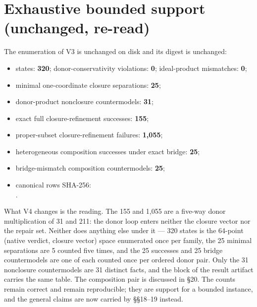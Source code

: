 \section{Exhaustive bounded support (unchanged, re-read)}

The enumeration of V3 is unchanged on disk and its digest is unchanged:

\begin{itemize}
  \item states: \textbf{320}; donor-conservativity violations: \textbf{0}; ideal-product
    mismatches: \textbf{0};
  \item minimal one-coordinate closure separations: \textbf{25};
  \item donor-product nonclosure countermodels: \textbf{31};
  \item exact full closure-refinement successes: \textbf{155};
  \item proper-subset closure-refinement failures: \textbf{1,055};
  \item heterogeneous composition successes under exact bridge: \textbf{25};
  \item bridge-mismatch composition countermodels: \textbf{25};
  \item canonical rows SHA-256:\\
    .
\end{itemize}

What V4 changes is the reading. The 155 and 1,055 are a five-way donor
multiplication of 31 and 211: the donor loop enters neither the closure vector
nor the repair set. Neither does anything else under it --- 320 states is the
64-point (native verdict, closure vector) space enumerated once per family, the
25 minimal separations are 5 counted five times, and the 25 successes and 25
bridge countermodels are one of each counted once per ordered donor pair. Only
the 31 nonclosure countermodels are 31 distinct facts, and the 
block of the result artifact carries the same table. The composition pair is
discussed in \S20. The counts remain
correct and remain reproducible; they are support for a bounded instance, and
the general claims are now carried by \S\S18--19 instead.
